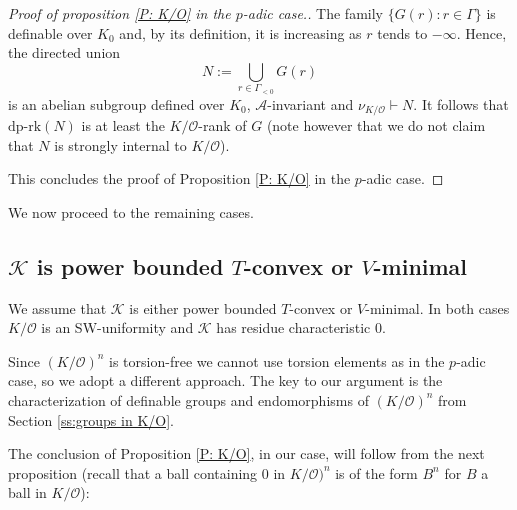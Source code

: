 \documentclass[11pt]{amsart}
\theoremstyle{definition}
\newcommand{\CA}{\mathcal A}
\newcommand{\CK}{{\mathcal K}}
\newcommand{\CO}{{\mathcal O}}
\newcommand{\0}{\emptyset}
\def\dpr{\mathrm{dp\text{-}rk}}
\begin{document}
\begin{proof}[Proof of proposition \ref{P: K/O} in the $p$-adic case.]
  The family $\{G(r):r\in \Gamma\}$  is definable over $K_0$ and, by its definition, it is increasing as $r$ tends to $-\infty$. Hence, the directed union $$N:=\bigcup\limits_{r\in \Gamma_{<0}} G(r)$$  is   an  abelian subgroup defined over $K_0$, $\CA$-invariant and $\nu_{K/\CO}\vdash N$.  It follows that $\dpr(N)$ is at least the $K/\CO$-rank of $G$ (note however that we do not claim that $N$ is strongly internal to $K/\CO$). 



This concludes the proof of Proposition \ref{P: K/O} in the $p$-adic case. \end{proof}


We now proceed to the remaining cases. 

\subsection{$\CK$ is power bounded $T$-convex or $V$-minimal}
We assume that $\CK$ is either power bounded $T$-convex or $V$-minimal. In both cases $K/\CO$ is an SW-uniformity and $\CK$ has residue characteristic $0$. 

Since $(K/\CO)^n$ is torsion-free we cannot use torsion elements as in the $p$-adic case, so we adopt a different approach. 
The key to our argument is the characterization of definable groups and endomorphisms of $(K/\CO)^n$ from  Section \ref{ss:groups in K/O}.



The conclusion of Proposition \ref{P: K/O}, in our case, will follow from the next proposition (recall that a ball containing $0$ in $K/\CO)^n$ is of the form $B^n$ for $B$ a ball in $K/\CO$): 
\end{document}
